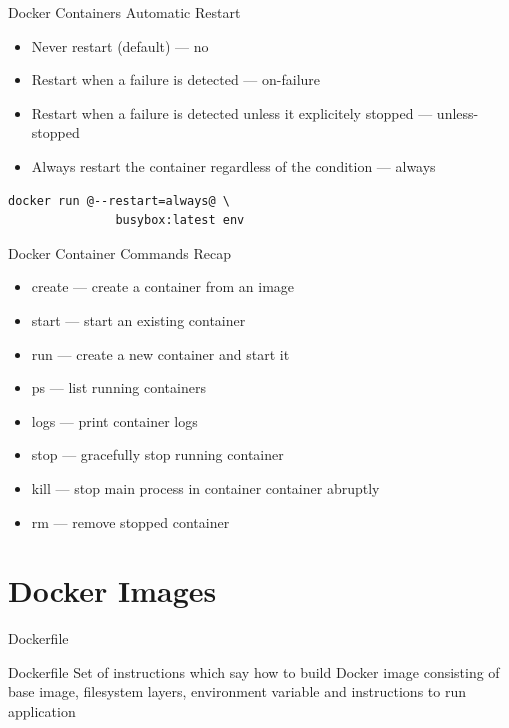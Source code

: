 \begin{frame}[fragile]{Docker Containers Automatic Restart}
  \begin{itemize}
    \item Never restart (default) --- no
    \item Restart when a failure is detected --- on-failure
    \item Restart when a failure is detected unless it explicitely stopped --- unless-stopped
    \item Always restart the container regardless of the condition --- always
  \end{itemize}  
  \begin{lstlisting}[basicstyle=\ttfamily\small\color{myblue}]
    docker run @--restart=always@ \
               busybox:latest env
  \end{lstlisting}  
\end{frame}

\begin{frame}{Docker Container Commands Recap}
  \begin{itemize}
    \item create --- create a container from an image
    \item start  --- start an existing container
    \item run    --- create a new container and start it
    \item ps     --- list running containers
    \item logs   --- print container logs
    \item stop   --- gracefully stop running container
    \item kill   --- stop main process in container container abruptly
    \item rm     --- remove stopped container
  \end{itemize}    
\end{frame}

\section{Docker Images}

\begin{frame}[fragile]{Dockerfile}
  \begin{exampleblock}{Dockerfile}
  Set of instructions which say how to build Docker image consisting of base image, filesystem layers, environment variable and instructions to run application
  \end{exampleblock}
\end{frame}

